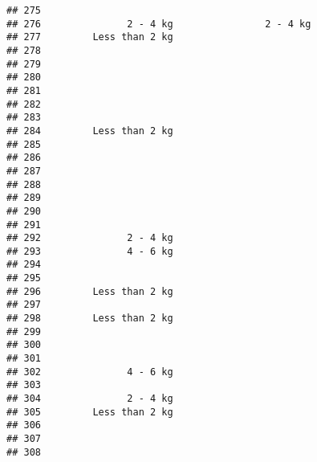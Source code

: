 \documentclass[
]{article}
\begin{document}
\begin{verbatim}
## 275                                                                      
## 276               2 - 4 kg                2 - 4 kg                       
## 277         Less than 2 kg                                               
## 278                                                                      
## 279                                                                      
## 280                                                                      
## 281                                                                      
## 282                                                                      
## 283                                                                      
## 284         Less than 2 kg                                               
## 285                                                                      
## 286                                                                      
## 287                                                                      
## 288                                                                      
## 289                                                                      
## 290                                                                      
## 291                                                                      
## 292               2 - 4 kg                                               
## 293               4 - 6 kg                                               
## 294                                                                      
## 295                                                                      
## 296         Less than 2 kg                                               
## 297                                                                      
## 298         Less than 2 kg                                               
## 299                                                                      
## 300                                                                      
## 301                                                                      
## 302               4 - 6 kg                                               
## 303                                                                      
## 304               2 - 4 kg                                               
## 305         Less than 2 kg                                               
## 306                                                                      
## 307                                                                      
## 308                                                                      

\end{verbatim}
\end{document}
